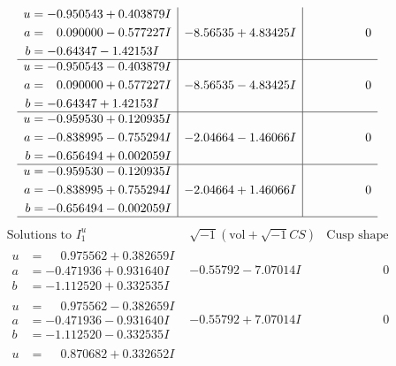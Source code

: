 \documentclass[1p]{elsarticle_modified}
\theoremstyle{definition}
\newcommand{\I}{\sqrt{-1}}
\begin{document}
$$\begin{array}{c|c|c}
\begin{aligned}
u &= -0.950543 + 0.403879 I \\
a &= \phantom{-}0.090000 - 0.577227 I \\
b &= -0.64347 - 1.42153 I\end{aligned}
 & -8.56535 + 4.83425 I & \phantom{-0.000000 } 0 \\ \hline\begin{aligned}
u &= -0.950543 - 0.403879 I \\
a &= \phantom{-}0.090000 + 0.577227 I \\
b &= -0.64347 + 1.42153 I\end{aligned}
 & -8.56535 - 4.83425 I & \phantom{-0.000000 } 0 \\ \hline\begin{aligned}
u &= -0.959530 + 0.120935 I \\
a &= -0.838995 - 0.755294 I \\
b &= -0.656494 + 0.002059 I\end{aligned}
 & -2.04664 - 1.46066 I & \phantom{-0.000000 } 0 \\ \hline\begin{aligned}
u &= -0.959530 - 0.120935 I \\
a &= -0.838995 + 0.755294 I \\
b &= -0.656494 - 0.002059 I\end{aligned}
 & -2.04664 + 1.46066 I & \phantom{-0.000000 } 0\\
 \hline 
 \end{array}$$\newpage$$\begin{array}{c|c|c}  
\text{Solutions to }I^u_{1}& \I (\text{vol} + \sqrt{-1}CS) & \text{Cusp shape}\\
 \hline 
\begin{aligned}
u &= \phantom{-}0.975562 + 0.382659 I \\
a &= -0.471936 + 0.931640 I \\
b &= -1.112520 + 0.332535 I\end{aligned}
 & -0.55792 - 7.07014 I & \phantom{-0.000000 } 0 \\ \hline\begin{aligned}
u &= \phantom{-}0.975562 - 0.382659 I \\
a &= -0.471936 - 0.931640 I \\
b &= -1.112520 - 0.332535 I\end{aligned}
 & -0.55792 + 7.07014 I & \phantom{-0.000000 } 0 \\ \hline\begin{aligned}
u &= \phantom{-}0.870682 + 0.332652 I \\

\end{aligned}
\end{array}$$
\end{document}

